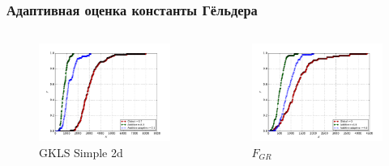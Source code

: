 \documentclass[aspectratio=1610]{beamer}
\begin{document}
\begin{frame}
\frametitle{Адаптивная оценка константы Гёльдера}
\begin{columns}
  \begin{column}{0.5\textwidth}
    \begin{figure}[ht]
      \centerline{\includegraphics[width=1.1\textwidth]{gkls-s.pdf}}
    \caption*{GKLS Simple 2d}
    \end{figure}
  \end{column}
  \begin{column}{0.5\textwidth}
    \begin{figure}[ht]
    \centerline{\includegraphics[width=1.1\textwidth]{grishagin.pdf}}
    \caption*{\(F_{GR}\)}
    \end{figure}
  \end{column}
\end{columns}

\end{frame}
\end{document}
